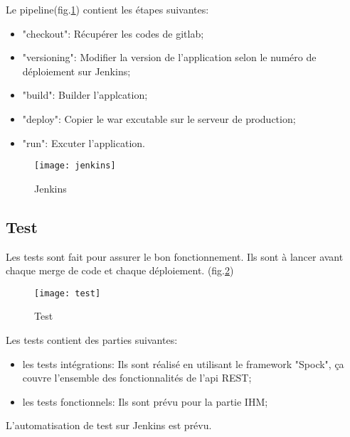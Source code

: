Le pipeline(fig.\ref{fig:jenkins}) contient les étapes suivantes:
\begin{itemize}
 \item "checkout": Récupérer les codes de gitlab;
 \item "versioning": Modifier la version de l'application selon le numéro de déploiement sur Jenkins;
 \item "build": Builder l'applcation;
 \item "deploy": Copier le war excutable sur le serveur de production;
 \item "run": Excuter l'application.
\end{itemize}

\begin{figure}[ht]
 \centering
 \texttt{[image: jenkins]}
 \caption{Jenkins}
 \label{fig:jenkins}
\end{figure}

\subsection{Test}

Les tests sont fait pour assurer le bon fonctionnement.
Ils sont à lancer avant chaque merge de code et chaque déploiement. (fig.\ref{fig:test})

\begin{figure}[ht]
 \centering
 \texttt{[image: test]}
 \caption{Test}
 \label{fig:test}
\end{figure}

Les tests contient des parties suivantes:
\begin{itemize}
 \item les tests intégrations: Ils sont réalisé en utilisant le framework "Spock",
       ça couvre l'ensemble des fonctionnalités de l'api REST;
 \item les tests fonctionnels: Ils sont prévu pour la partie IHM;
\end{itemize}

L'automatisation de test sur Jenkins est prévu.

\clearpage
